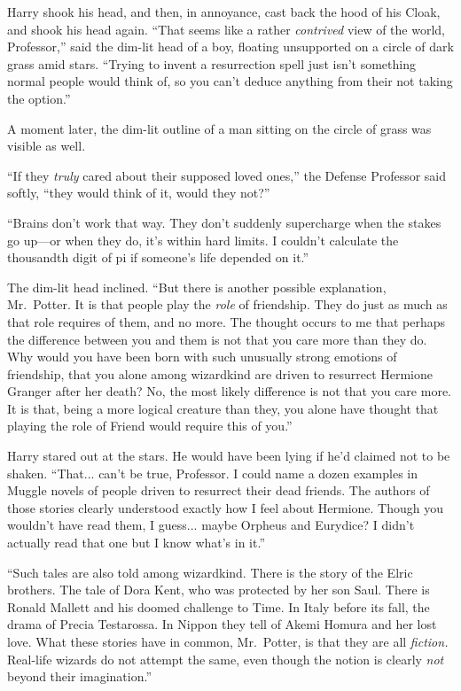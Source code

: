Harry shook his head, and then, in annoyance, cast back the hood of his Cloak, and shook his head again. “That seems like a rather \emph{contrived} view of the world, Professor,” said the dim-lit head of a boy, floating unsupported on a circle of dark grass amid stars. “Trying to invent a resurrection spell just isn’t something normal people would think of, so you can’t deduce anything from their not taking the option.”

A moment later, the dim-lit outline of a man sitting on the circle of grass was visible as well.

“If they \emph{truly} cared about their supposed loved ones,” the Defense Professor said softly, “they would think of it, would they not?”

“Brains don’t work that way. They don’t suddenly supercharge when the stakes go up—or when they do, it’s within hard limits. I couldn’t calculate the thousandth digit of pi if someone’s life depended on it.”

The dim-lit head inclined. “But there is another possible explanation, Mr.~Potter. It is that people play the \emph{role} of friendship. They do just as much as that role requires of them, and no more. The thought occurs to me that perhaps the difference between you and them is not that you care more than they do. Why would you have been born with such unusually strong emotions of friendship, that you alone among wizardkind are driven to resurrect Hermione Granger after her death? No, the most likely difference is not that you care more. It is that, being a more logical creature than they, you alone have thought that playing the role of Friend would require this of you.”

Harry stared out at the stars. He would have been lying if he’d claimed not to be shaken. “That... can’t be true, Professor. I could name a dozen examples in Muggle novels of people driven to resurrect their dead friends. The authors of those stories clearly understood exactly how I feel about Hermione. Though you wouldn’t have read them, I guess... maybe Orpheus and Eurydice? I didn’t actually read that one but I know what’s in it.”

“Such tales are also told among wizardkind. There is the story of the Elric brothers. The tale of Dora Kent, who was protected by her son Saul. There is Ronald Mallett and his doomed challenge to Time. In Italy before its fall, the drama of Precia Testarossa. In Nippon they tell of Akemi Homura and her lost love. What these stories have in common, Mr.~Potter, is that they are all \emph{fiction.} Real-life wizards do not attempt the same, even though the notion is clearly \emph{not} beyond their imagination.”


